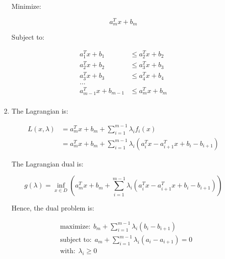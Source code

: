 \documentclass[11pt, letterpaper, titlepage]{article}
\begin{document}
\begin{enumerate}
\begin{enumerate}
        Minimize:
        
        \begin{equation*}
            a_m^T x + b_m
        \end{equation*}
        
        Subject to:
        
        \begin{equation*}
            \begin{aligned}
                a^T_1 x + b_1 &\leq a^T_2 x + b_2 \\
                a^T_2 x + b_2 &\leq a^T_3 x + b_3 \\
                a^T_3 x + b_3 &\leq a^T_4 x + b_4 \\
                ... \\
                a^T_{m-1} x + b_{m-1} &\leq a^T_m x + b_m \\
            \end{aligned}
        \end{equation*}
        
        \item %
        
        The Lagrangian is:
        
        \begin{equation*}
            \begin{aligned}
                L(x, \lambda) &= a_m^T x + b_m + \sum_{i = 1}^{m-1} \lambda_i f_i(x) \\
                &= a_m^T x + b_m + \sum_{i = 1}^{m-1} \lambda_i (a_i^T x - a_{i+1}^T x + b_i - b_{i+1})
            \end{aligned}
        \end{equation*}
        
        The Lagrangian dual is:
        
        \begin{equation*}
            g(\lambda) = \inf_{x \in D} (a_m^T x + b_m + \sum_{i = 1}^{m-1} \lambda_i (a_i^T x - a_{i+1}^T x + b_i - b_{i+1}))
        \end{equation*}
        
        Hence, the dual problem is:
        
        \begin{equation*}
            \begin{aligned}
                &\text{maximize:} \ \  b_m + \sum_{i = 1}^{m-1} \lambda_i (b_i - b_{i+1}) \\
                &\text{subject to:} \ \ a_m + \sum_{i = 1}^{m - 1} \lambda_i (a_i  - a_{i+1}) = 0 \\
                &\text{with:} \ \ \lambda_i \geq 0
            \end{aligned}
        \end{equation*}
        

\end{enumerate}
\end{enumerate}
\end{document}
